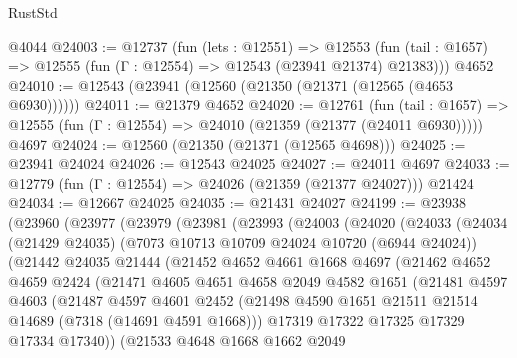 \begin{lexlean}{RustStd}
\begin{coremodule}
    @4044
@24003 := @12737
    (fun (lets : @12551) =>
    @12553 (fun (tail : @1657) => @12555 (fun (Γ : @12554) => @12543 (@23941 @21374) @21383)))
    @4652
@24010 := @12543 (@23941 (@12560 (@21350 (@21371 (@12565 (@4653 @6930))))))
@24011 := @21379 @4652
@24020 := @12761
    (fun (tail : @1657) => @12555 (fun (Γ : @12554) => @24010 (@21359 (@21377 (@24011 @6930)))))
    @4697
@24024 := @12560 (@21350 (@21371 (@12565 @4698)))
@24025 := @23941 @24024
@24026 := @12543 @24025
@24027 := @24011 @4697
@24033 := @12779 (fun (Γ : @12554) => @24026 (@21359 (@21377 @24027))) @21424
@24034 := @12667 @24025
@24035 := @21431 @24027
@24199 := @23938
    (@23960
      (@23977
        (@23979
          (@23981
            (@23993
              (@24003
                (@24020
                  (@24033
                    (@24034
                      (@21429 @24035)
                      (@7073 @10713 @10709 @24024 @10720 (@6944 @24024))
                      (@21442
                        @24035
                        @21444
                        (@21452
                          @4652
                          @4661
                          @1668
                          @4697
                          (@21462
                            @4652
                            @4659
                            @2424
                            (@21471
                              @4605
                              @4651
                              @4658
                              @2049
                              @4582
                              @1651
                              (@21481
                                @4597
                                @4603
                                (@21487
                                  @4597
                                  @4601
                                  @2452
                                  (@21498
                                    @4590
                                    @1651
                                    @21511
                                    @21514
                                    @14689
                                    (@7318 (@14691 @4591 @1668)))
                                  @17319
                                  @17322
                                  @17325
                                  @17329
                                  @17334
                                  @17340))
                              (@21533
                                @4648
                                @1668
                                @1662
                                @2049

\end{coremodule}
\end{lexlean}

